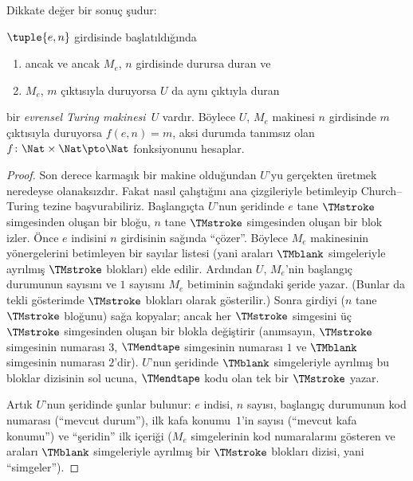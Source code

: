 \documentclass[../../../include/open-logic-section]{subfiles}
\begin{document}
Dikkate değer bir sonuç şudur:

\begin{thm} $\tuple{e,n}$ girdisinde
  başlatıldığında
  \begin{enumerate}
    \item ancak ve ancak $M_e$, $n$ girdisinde durursa duran ve
    \item $M_e$, $m$ çıktısıyla duruyorsa $U$ da aynı çıktıyla duran
  \end{enumerate}
  bir \emph{evrensel Turing makinesi}~$U$ vardır. Böylece $U$, $M_e$ makinesi
  $n$ girdisinde $m$ çıktısıyla duruyorsa $f(e,n)=m$, aksi durumda tanımsız
  olan $f\colon\Nat\times\Nat\pto\Nat$ fonksiyonunu hesaplar.
\end{thm}

\begin{proof}
  Son derece karmaşık bir makine olduğundan $U$'yu gerçekten üretmek
  neredeyse olanaksızdır. Fakat nasıl çalıştığını ana çizgileriyle betimleyip
  Church--Turing tezine başvurabiliriz. Başlangıçta $U$'nun şeridinde $e$
  tane $\TMstroke$ simgesinden oluşan bir bloğu, $n$ tane $\TMstroke$
  simgesinden oluşan bir blok izler. Önce $e$
  indisini $n$ girdisinin sağında ``çözer''. Böylece $M_e$ makinesinin
  yönergelerini betimleyen bir sayılar listesi (yani araları $\TMblank$
  simgeleriyle ayrılmış $\TMstroke$ blokları) elde edilir. Ardından $U$,
  $M_e$'nin başlangıç durumunun sayısını ve $1$ sayısını $M_e$ betiminin
  sağındaki şeride yazar. (Bunlar da tekli gösterimde $\TMstroke$ blokları
  olarak gösterilir.) Sonra girdiyi ($n$ tane $\TMstroke$ bloğunu) sağa
  kopyalar; ancak her $\TMstroke$ simgesini üç $\TMstroke$ simgesinden oluşan
  bir blokla değiştirir (anımsayın, $\TMstroke$ simgesinin numarası $3$,
  $\TMendtape$ simgesinin numarası $1$ ve $\TMblank$ simgesinin numarası
  $2$'dir). $U$'nun şeridinde $\TMblank$ simgeleriyle ayrılmış bu bloklar
  dizisinin sol ucuna, $\TMendtape$ kodu olan tek bir $\TMstroke$ yazar.

  Artık $U$'nun şeridinde şunlar bulunur: $e$ indisi, $n$ sayısı, başlangıç
  durumunun kod numarası (``mevcut durum''), ilk kafa konumu~$1$'in sayısı
  (``mevcut kafa konumu'') ve ``şeridin'' ilk içeriği ($M_e$ simgelerinin kod
  numaralarını gösteren ve araları $\TMblank$ simgeleriyle ayrılmış bir
  $\TMstroke$ blokları dizisi, yani ``simgeler'').


\end{proof}
\end{document}
